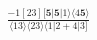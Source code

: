 \documentclass[varwidth, border=5pt]{standalone}
\begin{document}
\begin{my}
$\begin{gathered}
\scriptscriptstyle\frac{-1[23][𝟓|𝟓|1⟩⟨4𝟓⟩}{⟨13⟩⟨23⟩⟨1|2+4|3]}
\end{gathered}$
\end{my}
\end{document}
